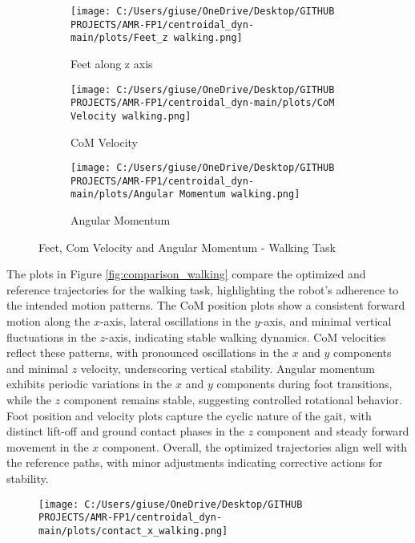 \documentclass[main.tex]{subfiles}
\begin{document}
\begin{sloppypar}
\begin{figure}[htbp]
    \centering
    \begin{subfigure}[b]{0.32\textwidth}
        \centering
        \texttt{[image: C:/Users/giuse/OneDrive/Desktop/GITHUB PROJECTS/AMR-FP1/centroidal\_dyn-main/plots/Feet\_z walking.png]}
        \caption{Feet along z axis}
        \label{fig:feet_z_walking}
    \end{subfigure}
    \hfill
    \begin{subfigure}[b]{0.32\textwidth}
        \centering
        \texttt{[image: C:/Users/giuse/OneDrive/Desktop/GITHUB PROJECTS/AMR-FP1/centroidal\_dyn-main/plots/CoM Velocity walking.png]}
        \caption{CoM Velocity}
        \label{fig:com_velocity_walking}
    \end{subfigure}
    \hfill
    \begin{subfigure}[b]{0.32\textwidth}
        \centering
        \texttt{[image: C:/Users/giuse/OneDrive/Desktop/GITHUB PROJECTS/AMR-FP1/centroidal\_dyn-main/plots/Angular Momentum walking.png]}
        \caption{Angular Momentum}
        \label{fig:angular_momentum_walking}
    \end{subfigure}
    \caption{Feet, Com Velocity and Angular Momentum - Walking Task}
    \label{fig:threeimages_walking}
\end{figure}
The plots in Figure \ref{fig:comparison_walking} compare the optimized and reference trajectories for the walking task, highlighting the robot’s adherence to the intended motion patterns. The CoM position plots show a consistent forward motion along the $x$-axis, lateral oscillations in the $y$-axis, and minimal vertical fluctuations in the $z$-axis, indicating stable walking dynamics. CoM velocities reflect these patterns, with pronounced oscillations in the $x$ and $y$ components and minimal $z$ velocity, underscoring vertical stability.
Angular momentum exhibits periodic variations in the $x$ and $y$ components during foot transitions, while the $z$ component remains stable, suggesting controlled rotational behavior. Foot position and velocity plots capture the cyclic nature of the gait, with distinct lift-off and ground contact phases in the $z$ component and steady forward movement in the $x$ component. Overall, the optimized trajectories align well with the reference paths, with minor adjustments indicating corrective actions for stability.
\begin{figure}[htbp]
    \centering
    \texttt{[image: C:/Users/giuse/OneDrive/Desktop/GITHUB PROJECTS/AMR-FP1/centroidal\_dyn-main/plots/contact\_x\_walking.png]}

\end{figure}
\end{sloppypar}
\end{document}
